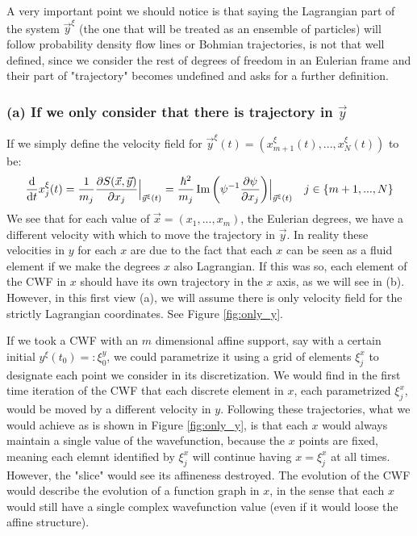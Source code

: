 \documentclass[11pt, a4paper]{article} %
\begin{document}
A very important point we should notice is that saying the Lagrangian part of the system $\vec{y}^\xi$ (the one that will be treated as an ensemble of particles) will follow probability density flow lines or Bohmian trajectories, is not that well defined, since we consider the rest of degrees of freedom in an Eulerian frame and their part of "trajectory" becomes undefined and asks for a further definition.



\subsubsection*{(a) If we only consider that there is trajectory in $\vec{y}$}

If we simply define the velocity field for $\vec{y}^\xi(t)=(x_{m+1}^\xi(t), ...,x_N^\xi(t))$ to be:
\begin{equation}
\dv{}{t}x_j^\xi(t)=\frac{1}{m_j}\pdv{S(\vec{x}, \vec{y})}{x_j}\Big\rvert_{\vec{y}^\xi(t)}=\frac{\hbar^2}{m_j}\Im\qty( \psi^{-1} \pdv{\psi}{x_j})\Big\rvert_{\vec{y}^\xi(t)} \quad j\in\{m+1,...,N\}
\end{equation}
We see that for each value of $\vec{x}=(x_1,...,x_m)$, the Eulerian degrees, we have a different velocity with which to move the trajectory in $\vec{y}$. In reality these velocities in $y$ for each $x$ are due to the fact that each $x$ can be seen as a fluid element if we make the degrees $x$ also Lagrangian. If this was so, each element of the CWF in $x$ should have its own trajectory in the $x$ axis, as we will see in (b). However, in this first view (a), we will assume there is only velocity field for the strictly Lagrangian coordinates. See Figure \ref{fig:only_y}.

If we took a CWF with an $m$ dimensional affine support, say with a certain initial $y^\xi(t_0)=:\xi_0^y$, we could parametrize it using a grid of elements $\xi^x_j$ to designate each point we consider in its discretization. We would find in the first time iteration of the CWF that each discrete element in $x$, each parametrized $\xi^x_j$, would be moved by a different velocity in $y$. Following these trajectories, what we would achieve as is shown in Figure \ref{fig:only_y}, is that each $x$ would always maintain a single value of the wavefunction, because the $x$ points are fixed, meaning each elemnt identified by $\xi^x_j$ will continue having $x=\xi^x_j$ at all times. However, the "slice" would see its affineness destroyed. The evolution of the CWF would describe the evolution of a function graph in $x$, in the sense that each $x$ would still have a single complex wavefunction value (even if it would loose the affine structure).
\end{document}
